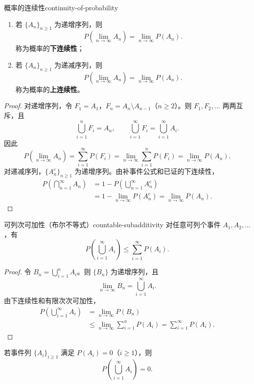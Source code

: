 \begin{mytheorem}{概率的连续性}{continuity-of-probability}
\begin{enumerate}
\item 若 $\{A_n\}_{n\geq1}$ 为递增序列，则
\[
P\left(\lim_{n\to\infty}A_n\right)=\lim_{n\to\infty}P(A_n).
\]
称为概率的\textbf{下连续性}；
\item 若 $\{A_n\}_{n\geq1}$ 为递减序列，则
\[
P\left(\lim_{n\to\infty}A_n\right)=\lim_{n\to\infty}P(A_n).
\]
称为概率的\textbf{上连续性}。
\end{enumerate}
\end{mytheorem}

\begin{proof}
对递增序列，令 $F_1=A_1$，$F_n=A_n\setminus A_{n-1}$（$n\geq2$）。则 $F_1,F_2,\ldots$ 两两互斥，且
\[
\bigcup_{i=1}^{n}F_i=A_n,
\qquad
\bigcup_{i=1}^{\infty}F_i=\bigcup_{i=1}^{\infty}A_i.
\]
因此
\[
P\left(\lim_{n\to\infty}A_n\right)
=\sum_{i=1}^{\infty}P(F_i)
=\lim_{n\to\infty}\sum_{i=1}^{n}P(F_i)
=\lim_{n\to\infty}P(A_n).
\]
对递减序列，$\{A_n^c\}_{n\geq1}$ 为递增序列。由补事件公式和已证的下连续性，
\[
\begin{aligned}
P\left(\bigcap_{n=1}^{\infty}A_n\right)
&=1-P\left(\bigcup_{n=1}^{\infty}A_n^c\right)\\
&=1-\lim_{n\to\infty}P(A_n^c)
=\lim_{n\to\infty}P(A_n).
\end{aligned}
\]
\end{proof}

\begin{proposition}{可列次可加性（布尔不等式）}{countable-subadditivity}
对任意可列个事件 $A_1,A_2,\ldots$，有
\[
P\left(\bigcup_{i=1}^{\infty}A_i\right)
\leq\sum_{i=1}^{\infty}P(A_i).
\]
\end{proposition}

\begin{proof}
令 $B_n=\bigcup_{i=1}^{n}A_i$。则 $\{B_n\}$ 为递增序列，且
\[
\lim_{n\to\infty}B_n=\bigcup_{i=1}^{\infty}A_i.
\]
由下连续性和有限次次可加性，
\[
\begin{aligned}
P\left(\bigcup_{i=1}^{\infty}A_i\right)
&=\lim_{n\to\infty}P(B_n)\\
&\leq\lim_{n\to\infty}\sum_{i=1}^{n}P(A_i)
=\sum_{i=1}^{\infty}P(A_i).
\end{aligned}
\]
\end{proof}

\begin{example}[可列个零概率事件的并]
若事件列 $\{A_i\}_{i\geq1}$ 满足 $P(A_i)=0$（$i\geq1$），则
\[
P\left(\bigcup_{i=1}^{\infty}A_i\right)=0.
\]
\end{example}

